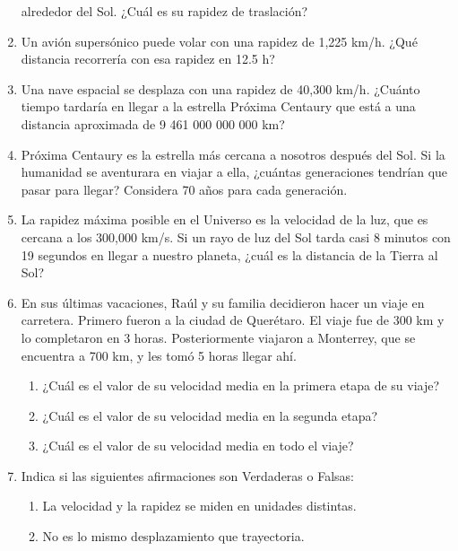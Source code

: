\documentclass[11pt]{book}
\begin{document}
\begin{enumerate}
          alrededor del Sol. ¿Cuál es su rapidez de traslación?
    \item Un avión supersónico puede volar con una rapidez de 1,225 km/h. ¿Qué distancia recorrería
          con esa rapidez en 12.5 h?
    \item Una nave espacial se desplaza con una rapidez de 40,300 km/h. ¿Cuánto tiempo tardaría en
          llegar a la estrella Próxima Centaury que está a una distancia aproximada de 9 461 000 000 000 km?
    \item Próxima Centaury es la estrella más cercana a nosotros después del Sol.
          Si la humanidad se aventurara en viajar a ella, ¿cuántas generaciones tendrían
          que pasar para llegar? Considera 70 años para cada generación.
    \item La rapidez máxima posible en el Universo es la velocidad de la luz, que es cercana a
          los 300,000 km/s. Si un rayo de luz del Sol tarda casi 8 minutos con 19 segundos
          en llegar a nuestro planeta, ¿cuál es la distancia de la Tierra al Sol?
    \item En sus últimas vacaciones, Raúl y su familia decidieron hacer un viaje en carretera. Primero fueron a la ciudad de Querétaro. El viaje fue de 300 km y lo completaron en 3 horas. Posteriormente viajaron a Monterrey, que se encuentra a 700 km, y les tomó 5 horas llegar ahí.
          \begin{enumerate}
              \item ¿Cuál es el valor de su velocidad media en la primera etapa de su viaje?
              \item ¿Cuál es el valor de su velocidad media en la segunda etapa?
              \item ¿Cuál es el valor de su velocidad media en todo el viaje?
          \end{enumerate}
    \item Indica si las siguientes afirmaciones son Verdaderas o Falsas:
          \begin{enumerate}
              \item La velocidad y la rapidez se miden en unidades distintas.\\
              \item No es lo mismo desplazamiento que trayectoria.\\

\end{enumerate}
\end{enumerate}
\end{document}

